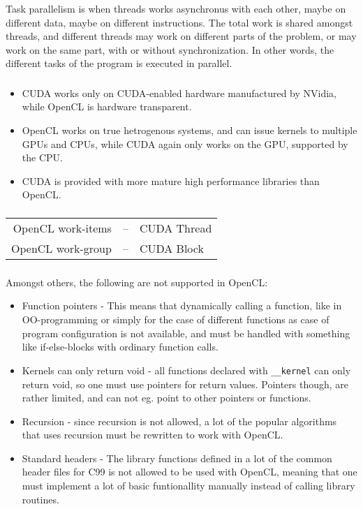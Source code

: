 \documentclass[english,a4paper,numbers=noenddot]{article}
\begin{document}
Task parallelism is when threads works asynchronus with each other, maybe on different data, maybe on different instructions. The total work is shared amongst threads, and different threads may work on different parts of the problem, or may work on the same part, with or without synchronization. In other words, the different tasks of the program is executed in parallel.

\subsubsection{}
\begin{itemize}
\item CUDA works only on CUDA-enabled hardware manufactured by NVidia, while OpenCL is hardware transparent.
\item OpenCL works on true hetrogenous systems, and can issue kernels to multiple GPUs and CPUs, while CUDA again only works on the GPU, supported by the CPU.
\item CUDA is provided with more mature high performance libraries than OpenCL.
\end{itemize}

\subsubsection{}
\begin{tabular}{rcl}
OpenCL work-items&--&CUDA Thread\\
OpenCL work-group&--&CUDA Block\\
\end{tabular}

\subsubsection{}
Amongst others, the following are not supported in OpenCL:
\begin{itemize}
\item Function pointers - This means that dynamically calling a function, like in OO-programming or simply for the case of different functions as case of program configuration is not available, and must be handled with something like if-else-blocks with ordinary function calls.
\item Kernels can only return void - all functions declared with \texttt{\_\_kernel} can only return void, so one must use pointers for return values. Pointers though, are rather limited, and can not eg. point to other pointers or functions.
\item Recursion - since recursion is not allowed, a lot of the popular algorithms that uses recursion must be rewritten to work with OpenCL.
\item Standard headers - The library functions defined in a lot of the common header files for C99 is not allowed to be used with OpenCL, meaning that one must implement a lot of basic funtionallity manually instead of calling library routines.
\end{itemize}
\end{document}
